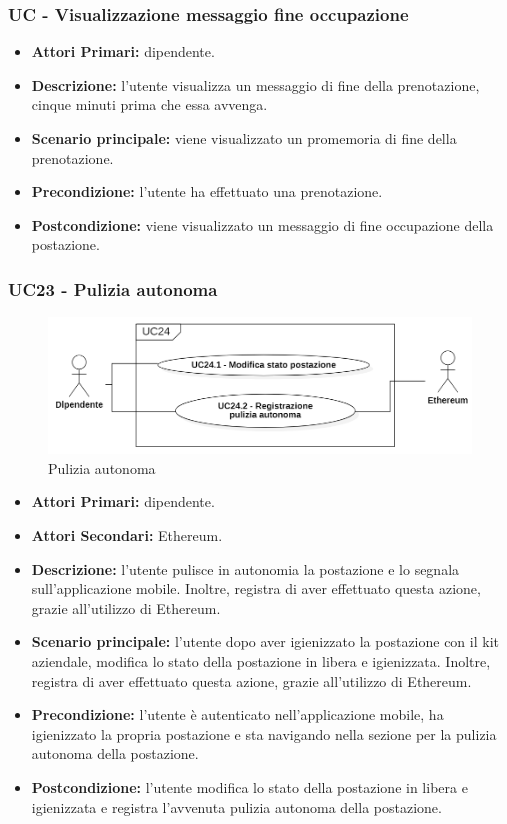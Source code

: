 \subsubsection{ UC - Visualizzazione messaggio fine occupazione}
\begin{itemize}
	\item\textbf{Attori Primari:} dipendente.
	\item\textbf{Descrizione:} l’utente visualizza un messaggio di fine della prenotazione, cinque minuti prima che essa avvenga.
	\item\textbf{Scenario principale:} viene visualizzato un promemoria di fine della prenotazione.
	\item\textbf{Precondizione:} l’utente ha effettuato una prenotazione.
	\item\textbf{Postcondizione:} viene visualizzato un messaggio di fine occupazione della postazione.
\end{itemize}

\subsubsection{ UC23 - Pulizia autonoma}
\begin{figure}[H]
	\centering
	\includegraphics[width=15cm]{res/images/UC23.png}
	\caption{Pulizia autonoma}
	\label{fig:Pulizia autonoma}
\end{figure}
\begin{itemize}
	\item\textbf{Attori Primari:} dipendente.
	\item\textbf{Attori Secondari:} Ethereum.
	\item\textbf{Descrizione:} l’utente pulisce in autonomia la postazione e lo segnala sull'applicazione mobile. Inoltre, 
	registra di aver effettuato questa azione, grazie all'utilizzo di Ethereum.	
	\item\textbf{Scenario principale:} l’utente dopo aver igienizzato la postazione con il kit aziendale, modifica lo stato della postazione in libera e igienizzata. Inoltre, 
	registra di aver effettuato questa azione, grazie all'utilizzo di Ethereum.
	\item\textbf{Precondizione:} l’utente è autenticato nell'applicazione mobile, ha igienizzato la propria postazione e sta navigando nella sezione per la pulizia 
	autonoma della postazione.
	\item\textbf{Postcondizione:} l’utente modifica lo stato della postazione in libera e igienizzata e registra l'avvenuta pulizia autonoma della postazione.
\end{itemize}
